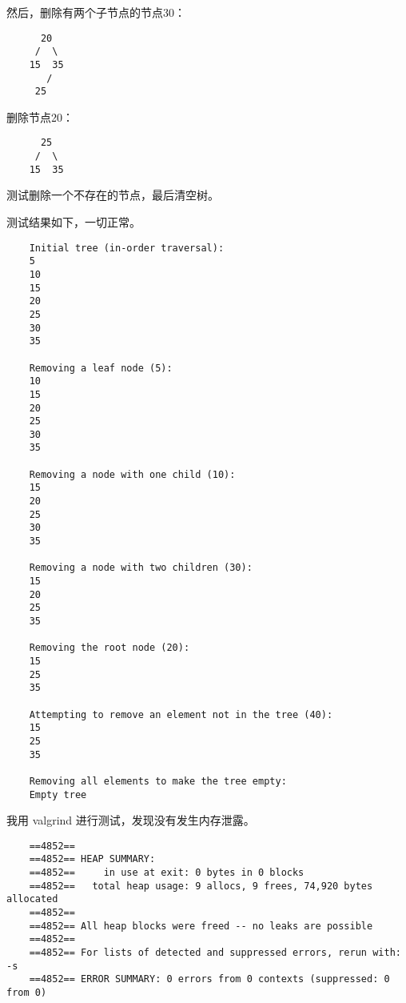 \documentclass[UTF8]{ctexart}
\begin{document}
然后，删除有两个子节点的节点30：
\begin{lstlisting}
      20
     /  \
    15  35
       /
     25
\end{lstlisting}
删除节点20：
\begin{lstlisting}
      25
     /  \
    15  35
\end{lstlisting}
测试删除一个不存在的节点，最后清空树。\par
测试结果如下，一切正常。
\begin{lstlisting}
    Initial tree (in-order traversal):
    5
    10
    15
    20
    25
    30
    35
    
    Removing a leaf node (5):
    10
    15
    20
    25
    30
    35
    
    Removing a node with one child (10):
    15
    20
    25
    30
    35
    
    Removing a node with two children (30):
    15
    20
    25
    35
    
    Removing the root node (20):
    15
    25
    35
    
    Attempting to remove an element not in the tree (40):
    15
    25
    35
    
    Removing all elements to make the tree empty:
    Empty tree
\end{lstlisting}
我用 valgrind 进行测试，发现没有发生内存泄露。
\begin{lstlisting}
    ==4852== 
    ==4852== HEAP SUMMARY:
    ==4852==     in use at exit: 0 bytes in 0 blocks
    ==4852==   total heap usage: 9 allocs, 9 frees, 74,920 bytes allocated
    ==4852== 
    ==4852== All heap blocks were freed -- no leaks are possible
    ==4852== 
    ==4852== For lists of detected and suppressed errors, rerun with: -s
    ==4852== ERROR SUMMARY: 0 errors from 0 contexts (suppressed: 0 from 0)      
\end{lstlisting}
\end{document}
